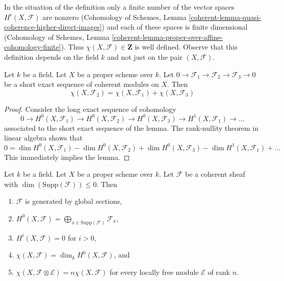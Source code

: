 \noindent
In the situation of the definition only a finite number of the vector spaces
$H^i(X, \mathcal{F})$ are nonzero (Cohomology of Schemes, Lemma
\ref{coherent-lemma-quasi-coherence-higher-direct-images})
and each of these spaces is finite dimensional
(Cohomology of Schemes, Lemma
\ref{coherent-lemma-proper-over-affine-cohomology-finite}). Thus
$\chi(X, \mathcal{F}) \in \mathbf{Z}$ is well defined. Observe that
this definition depends on the field $k$ and not just on the pair
$(X, \mathcal{F})$.

\begin{lemma}
\label{lemma-euler-characteristic-additive}
Let $k$ be a field. Let $X$ be a proper scheme over $k$.
Let $0 \to \mathcal{F}_1 \to \mathcal{F}_2 \to \mathcal{F}_3 \to 0$
be a short exact sequence of coherent modules on $X$. Then
$$
\chi(X, \mathcal{F}_2) = \chi(X, \mathcal{F}_1) + \chi(X, \mathcal{F}_3)
$$
\end{lemma}

\begin{proof}
Consider the long exact sequence of cohomology
$$
0 \to H^0(X, \mathcal{F}_1) \to H^0(X, \mathcal{F}_2) \to
H^0(X, \mathcal{F}_3) \to H^1(X, \mathcal{F}_1) \to \ldots
$$
associated to the short exact sequence of the lemma. The rank-nullity theorem
in linear algebra shows that
$$
0 = \dim H^0(X, \mathcal{F}_1) - \dim H^0(X, \mathcal{F}_2)
+ \dim H^0(X, \mathcal{F}_3) - \dim H^1(X, \mathcal{F}_1) + \ldots
$$
This immediately implies the lemma.
\end{proof}

\begin{lemma}
\label{lemma-chi-tensor-finite}
Let $k$ be a field. Let $X$ be a proper scheme over $k$. Let $\mathcal{F}$
be a coherent sheaf with $\dim(\text{Supp}(\mathcal{F})) \leq 0$.
Then
\begin{enumerate}
\item $\mathcal{F}$ is generated by global sections,
\item $H^0(X, \mathcal{F}) =
\bigoplus_{x \in \text{Supp}(\mathcal{F})} \mathcal{F}_x$,
\item $H^i(X, \mathcal{F}) = 0$ for $i > 0$,
\item $\chi(X, \mathcal{F}) = \dim_k H^0(X, \mathcal{F})$, and
\item
$\chi(X, \mathcal{F} \otimes \mathcal{E}) = n\chi(X, \mathcal{F})$
for every locally free module $\mathcal{E}$ of rank $n$.
\end{enumerate}
\end{lemma}

